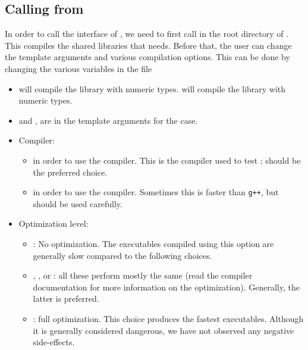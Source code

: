 \documentclass[a4paper,11pt]{article}
\begin{document}
	
	\subsection{Calling \mimes from \PY}
	In order to call the \PY interface of \mimes, we need to first call  in the root directory of \mimes. This compiles the shared libraries 
	that \PY needs. Before that, the user can change the template arguments and various compilation options. This can be done by changing the various variables in the 
	file  
	\begin{itemize}
		\item {} will compile the library with  numeric types.  will compile the library with  numeric types.
		\item {} and , are in the template arguments for the \CPP case.
		\item Compiler:
		\begin{itemize}
			\item {} in order to use the  \CPP compiler. This is the compiler used to test \mimes; \ie should be the preferred choice.
			\item {} in order to use the  \CPP compiler. Sometimes this is faster than {\tt g++}, but should be used carefully.
		\end{itemize}
		\item Optimization level:
		\begin{itemize}
			\item {}: No optimization. The executables compiled using this option are generally slow compared to the following choices.
			\item {}, , or : all these perform mostly the same (read the compiler documentation for more information on the optimization). Generally, the latter
			is preferred.
			\item {}: full optimization. This choice produces the fastest executables. Although it is generally considered dangerous, we have not observed any
			negative side-effects.  
		\end{itemize}
	\end{itemize}
	
	
\end{document}
